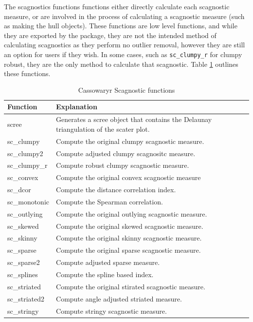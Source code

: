 The scagnostics functions functions either directly calculate each scagnostic measure, or are involved in the process of calculating a scagnostic measure (such as making the hull objects). These functions are low level functions, and while they are exported by the package, they are not the intended method of calculating scagnostics as they perform no outlier removal, however they are still an option for users if they wish. In some cases, such as \texttt{sc\_clumpy\_r} for clumpy robust, they are the only method to calculate that scagnostic. Table \ref{tab:scagfuncs-tb-pdf} outlines these functions.

\begin{table}

\caption{\label{tab:scagfuncs-tb-pdf}Cassowaryr Scagnostic functions}
\centering
\begin{tabular}[t]{>{\raggedright\arraybackslash}p{3cm}>{\raggedright\arraybackslash}p{10cm}}
\toprule
Function & Explanation\\
\midrule
scree & Generates a scree object that contains the Delaunay triangulation of the scater plot.\\
sc\_clumpy & Compute the original clumpy scagnostic measure.\\
sc\_clumpy2 & Compute adjusted clumpy scagnositc measure.\\
sc\_clumpy\_r & Compute robust clumpy scagnostic measure.\\
sc\_convex & Compute the original convex scagnostic measure\\
\addlinespace
sc\_dcor & Compute the distance correlation index.\\
sc\_monotonic & Compute the Spearman correlation.\\
sc\_outlying & Compute the original outlying scagnostic measure.\\
sc\_skewed & Compute the original skewed scagnostic measure.\\
sc\_skinny & Compute the original skinny scagnostic measure.\\
\addlinespace
sc\_sparse & Compute the original sparse scagnostic measure.\\
sc\_sparse2 & Compute adjusted sparse measure.\\
sc\_splines & Compute the spline based index.\\
sc\_striated & Compute the original stirated scagnostic measure.\\
sc\_striated2 & Compute angle adjusted striated measure.\\
\addlinespace
sc\_stringy & Compute stringy scagnostic measure.\\
\bottomrule
\end{tabular}
\end{table}

